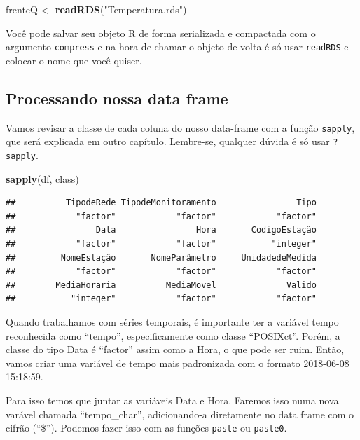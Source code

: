\documentclass[]{book}
\newenvironment{Shaded}{\begin{snugshade}}{\end{snugshade}}
\newcommand{\KeywordTok}[1]{\textcolor[rgb]{0.13,0.29,0.53}{\textbf{#1}}}
\newcommand{\StringTok}[1]{\textcolor[rgb]{0.31,0.60,0.02}{#1}}
\newcommand{\NormalTok}[1]{#1}
\theoremstyle{definition}
\theoremstyle{definition}
\theoremstyle{definition}
\theoremstyle{remark}
\begin{document}
\begin{Shaded}
\begin{Highlighting}[]
\NormalTok{frenteQ <-}\StringTok{ }\KeywordTok{readRDS}\NormalTok{(}\StringTok{"Temperatura.rds"}\NormalTok{)}
\end{Highlighting}
\end{Shaded}

Você pode salvar seu objeto R de forma serializada e compactada com o
argumento \texttt{compress} e na hora de chamar o objeto de volta é só
usar \texttt{readRDS} e colocar o nome que você quiser.

\hypertarget{processing_dfs}{\subsection{Processando nossa data
frame}\label{processing_dfs}}

Vamos revisar a classe de cada coluna do nosso data-frame com a função
\texttt{sapply}, que será explicada em outro capítulo. Lembre-se,
qualquer dúvida é só usar \texttt{?sapply}.

\begin{Shaded}
\begin{Highlighting}[]
\KeywordTok{sapply}\NormalTok{(df, class)}
\end{Highlighting}
\end{Shaded}

\begin{verbatim}
##          TipodeRede TipodeMonitoramento                Tipo 
##            "factor"            "factor"            "factor" 
##                Data                Hora       CodigoEstação 
##            "factor"            "factor"           "integer" 
##         NomeEstação       NomeParâmetro     UnidadedeMedida 
##            "factor"            "factor"            "factor" 
##        MediaHoraria          MediaMovel              Valido 
##           "integer"            "factor"            "factor"
\end{verbatim}

Quando trabalhamos com séries temporais, é importante ter a variável
tempo reconhecida como ``tempo'', especificamente como classe
``POSIXct''. Porém, a classe do tipo Data é ``factor'' assim como a
Hora, o que pode ser ruim. Então, vamos criar uma variável de tempo mais
padronizada com o formato 2018-06-08 15:18:59.

Para isso temos que juntar as variáveis Data e Hora. Faremos isso numa
nova varável chamada ``tempo\_char'', adicionando-a diretamente no data
frame com o cifrão (``\$''). Podemos fazer isso com as funções
\texttt{paste} ou \texttt{paste0}.
\end{document}
